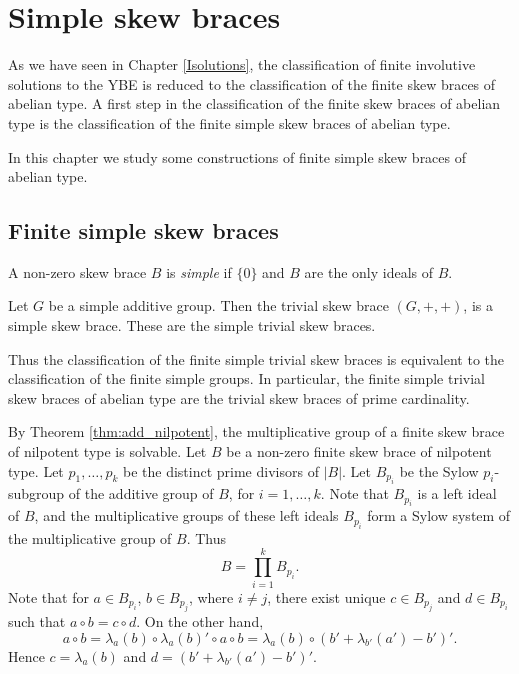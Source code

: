 \chapter{Simple skew braces}
\label{Sbraces}


As we have seen in Chapter \ref{Isolutions}, the classification of finite involutive solutions to the YBE is reduced to the classification of the finite skew braces of abelian type. A first step in the classification of the finite skew braces of abelian type is the classification of the finite simple skew braces of abelian type.

In this chapter we study some constructions of finite simple skew braces of abelian type. 

\section{Finite simple skew braces}

\begin{definition}
A non-zero skew brace $B$ is \emph{simple} if $\{0\}$ and $B$ are the only ideals of $B$.
\end{definition}


\begin{example}
Let $G$ be a simple additive group. Then the trivial skew brace $(G,+,+)$, is a simple skew brace. These are the simple trivial skew braces.
\end{example}

Thus the classification of the finite simple trivial skew braces is equivalent to the classification of the finite simple groups.
In particular, the finite simple trivial skew braces of abelian type are the trivial skew braces of prime cardinality. 

By Theorem \ref{thm:add_nilpotent}, the multiplicative group of a finite skew brace of nilpotent type is solvable. Let $B$ be a non-zero finite skew brace of nilpotent type. Let $p_1,\dots ,p_k$ be the distinct prime divisors of $|B|$. Let $B_{p_i}$ be the Sylow $p_i$-subgroup of the additive group of $B$, for $i=1,\dots ,k$. Note that $B_{p_i}$ is a left ideal of $B$, and the multiplicative groups of these left ideals $B_{p_i}$ form a Sylow system of the multiplicative group of $B$. Thus
$$B=\prod_{i=1}^kB_{p_i}.$$
Note that for $a\in B_{p_i}$, $b\in B_{p_j}$, where $i\neq j$, there exist unique $c\in B_{p_j}$ and $d\in B_{p_i}$ such that $a\circ b=c\circ d$. On the other hand, 
$$a\circ b=\lambda_a(b)\circ \lambda_a(b)'\circ a\circ b=\lambda_a(b)\circ (b'+\lambda_{b'}(a')-b')'.$$
Hence $c=\lambda_a(b)$ and $d=(b'+\lambda_{b'}(a')-b')'$.
    


